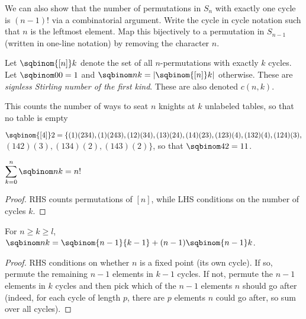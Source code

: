 \documentclass[a4paper]{article}
\begin{document}
\begin{example}
We can also show that the number of permutations in $S_n$ with exactly one cycle is $(n-1)!$ via a combinatorial argument. Write the cycle in cycle notation such that $n$ is the leftmost element. Map this bijectively to a permutation in $S_{n-1}$ (written in one-line notation) by removing the character $n$.
\end{example}

\begin{definition}
Let $\sqbinom{[n]}k$ denote the set of all $n$-permutations with exactly $k$ cycles. Let $\sqbinom00=1$ and $\sqbinom nk=\left|\sqbinom{[n]}k\right|$ otherwise. These are \emph{signless Stirling number of the first kind}. These are also denoted $c(n,k)$.
\begin{arrows}
\item This counts the number of ways to seat $n$ knights at $k$ unlabeled tables, so that no table is empty
\end{arrows}
\end{definition}

\begin{example}
$\sqbinom{[4]}2=\{(1)(234),(1)(243),(12)(34),(13)(24),(14)(23),(123)(4),(132)(4),(124)(3),$\linebreak $(142)(3),(134)(2),(143)(2)\}$, so that $\sqbinom42=11$.
\end{example}

\begin{proposition}
$\displaystyle\sum_{k=0}^n\sqbinom nk=n!$

\begin{hl}
\begin{proof}
RHS counts permutations of $[n]$, while LHS conditions on the number of cycles $k$.
\end{proof}
\end{hl}
\end{proposition}

\begin{proposition}
For $n\geq k\geq l$, $\displaystyle\sqbinom nk=\sqbinom{n-1}{k-1}+(n-1)\sqbinom{n-1}k$.

\begin{hl}
\begin{proof}
RHS conditions on whether $n$ is a fixed point (its own cycle). If so, permute the remaining $n-1$ elements in $k-1$ cycles. If not, permute the $n-1$ elements in $k$ cycles and then pick which of the $n-1$ elements $n$ should go after (indeed, for each cycle of length $p$, there are $p$ elements $n$ could go after, so sum over all cycles).
\end{proof}
\end{hl}
\end{proposition}
\end{document}
